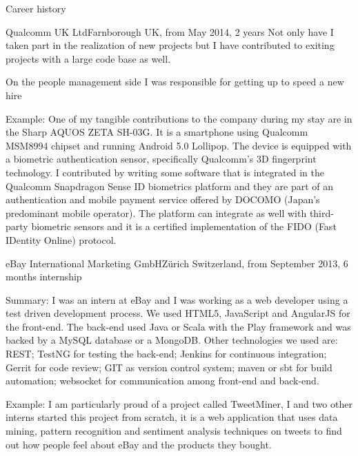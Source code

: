 \documentclass{resume}
\begin{document}
\begin{rSection}{Career history}
\begin{rSubsection}{Qualcomm UK Ltd}{Farnborough UK, from May 2014, 2 years}{}{}
	  Not only have I taken part in the realization of new projects but I have contributed to exiting projects with a large code base as well.

	  On the people management side I was responsible for getting up to speed a new hire
	  
	  
	\item[Example:]
	  One of my tangible contributions to the company during my stay are in the Sharp AQUOS ZETA SH-03G.
	  It is a smartphone using Qualcomm MSM8994 chipset and running Android 5.0 Lollipop. 
	  The device is equipped with a biometric authentication sensor, specifically
	  Qualcomm's 3D fingerprint technology.
	  I contributed by writing some software
	  that is integrated in the Qualcomm Snapdragon Sense ID biometrics platform and they
	  are part of an authentication and mobile payment service offered by DOCOMO (Japan's predominant mobile operator).
	  The platform can integrate as well with third-party biometric sensors and it is a certified
	  implementation of the FIDO (Fast IDentity Online) protocol.
    \end{rSubsection}

    \begin{rSubsection}{eBay International Marketing GmbH}{Z\"urich Switzerland, from September 2013, 6 months internship}{}{}
	  \item[Summary:]  
	    I was an intern at eBay and I was working as a web developer using a test driven development process. 
	    We used HTML5, JavaScript and AngularJS for the front-end. 
	    The back-end used Java or Scala with the Play framework and was backed by a MySQL database or a MongoDB. 
	    Other technologies we used are: 
	        REST;
	    	TestNG for testing the back-end; 
		Jenkins for continuous integration; 
		Gerrit for code review; 
	    	GIT as version control system; 
		maven or sbt for build automation;
		websocket for communication among front-end and back-end.	  
	  \item[Example:]
	    I am particularly proud of a project called TweetMiner, 
	    I and two other interns started this project from scratch,
	    it is a web application that uses data mining, pattern recognition and sentiment analysis techniques on tweets to find out how people feel about eBay and the products they bought. 
    \end{rSubsection}


\end{rSection}
\end{document}
